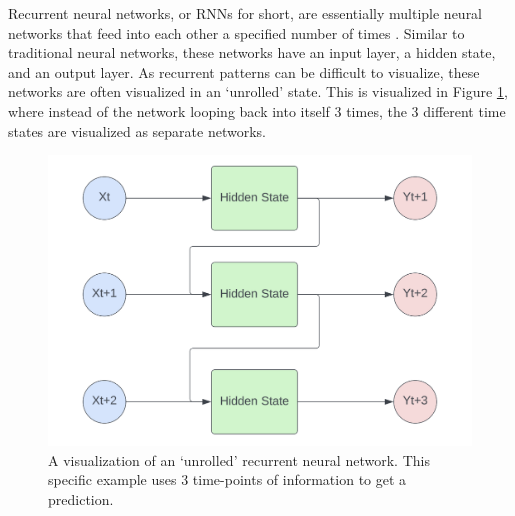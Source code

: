 Recurrent neural networks, or RNNs for short, are essentially multiple neural networks that feed into each other a specified number of times \citep{rumelhart1986learning}. Similar to traditional neural networks, these networks have an input layer, a hidden state, and an output layer. As recurrent patterns can be difficult to visualize, these networks are often visualized in an `unrolled' state. This is visualized in Figure \ref{fig:RNN}, where instead of the network looping back into itself 3 times, the 3 different time states are visualized as separate networks.

\begin{figure}[ht]
    \centering
    \includegraphics[width=0.6\linewidth]{"Figures/Recurrent_NN.png"}
    \caption{A visualization of an `unrolled' recurrent neural network. This specific example uses 3 time-points of information to get a prediction.}
    \label{fig:RNN}
\end{figure}

